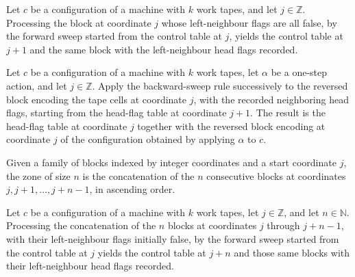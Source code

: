 \begin{lemma}
\label{Turing.FinTM.read_row}
\leanok
{}
Let $c$ be a configuration of a machine with $k$ work tapes, and let $j \in \mathbb{Z}$.
Processing the block at coordinate $j$ whose left-neighbour flags are all false, by the
forward sweep started from the control table at $j$, yields the control table at $j+1$
and the same block with the left-neighbour head flags recorded.
\end{lemma}

\begin{lemma}
\label{Turing.FinTM.write_row}
\leanok
{}
Let $c$ be a configuration of a machine with $k$ work tapes, let $\alpha$ be a one-step
action, and let $j\in\mathbb{Z}$. Apply the backward-sweep rule successively to the
reversed block encoding the tape cells at coordinate $j$, with the recorded neighboring
head flags, starting from the head-flag table at coordinate $j+1$. The result is the
head-flag table at coordinate $j$ together with the reversed block encoding at
coordinate $j$ of the configuration obtained by applying $\alpha$ to $c$.
\end{lemma}

\begin{definition}
\label{Turing.FinTM.tapeZone}
\leanok
Given a family of blocks indexed by integer coordinates and a start coordinate $j$, the
zone of size $n$ is the concatenation of the $n$ consecutive blocks at coordinates
$j, j+1, \dots, j+n-1$, in ascending order.
\end{definition}

\begin{lemma}
\label{Turing.FinTM.read_zone}
\leanok
{}
Let $c$ be a configuration of a machine with $k$ work tapes, let $j \in \mathbb{Z}$, and
let $n \in \mathbb{N}$. Processing the concatenation of the $n$ blocks at coordinates
$j$ through $j+n-1$, with their left-neighbour flags initially false, by the forward
sweep started from the control table at $j$ yields the control table at $j+n$ and those
same blocks with their left-neighbour head flags recorded.
\end{lemma}

